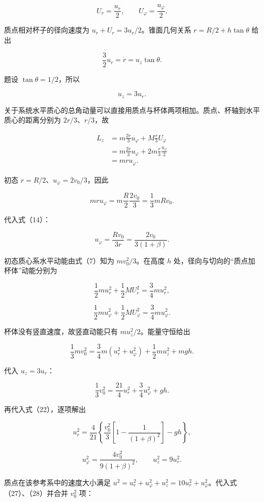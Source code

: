 \documentclass[12pt,a4paper,UTF8]{ctexart}
\begin{document}
\[
U_r=\frac{u_r}{2},
\qquad
U_\varphi=\frac{u_\varphi}{2}.
\tag{17}
\]

质点相对杯子的径向速度为 \(u_r+U_r=3u_r/2\)。锥面几何关系
\(r=R/2+h\tan\theta\) 给出

\[
\frac{3}{2}u_r
=\dot r
=u_z\tan\theta.
\tag{18}
\]

题设 \(\tan\theta=1/2\)，所以

\[
\boxed{u_z=3u_r}.
\tag{19}
\]

关于系统水平质心的总角动量可以直接用质点与杯体两项相加。质点、杯轴到水平质心的距离分别为
\(2r/3\)、\(r/3\)，故

\[
\begin{aligned}
L_z
&=m\frac{2r}{3}u_\varphi
+M\frac r3U_\varphi\\
&=m\frac{2r}{3}u_\varphi
+2m\frac r3\frac{u_\varphi}{2}\\
&=mru_\varphi.
\end{aligned}
\tag{20}
\]

初态 \(r=R/2\)、\(u_\varphi=2v_0/3\)，因此

\[
mr u_\varphi
=m\frac R2\frac{2v_0}{3}
=\frac13mRv_0.
\tag{21}
\]

代入式（14）：

\[
\boxed{
u_\varphi
=\frac{Rv_0}{3r}
=\frac{2v_0}{3(1+\beta)}
}.
\tag{22}
\]

初态质心系水平动能由式（7）知为 \(mv_0^2/3\)。在高度 \(h\)
处，径向与切向的``质点加杯体''动能分别为

\[
\frac12m u_r^2+\frac12M U_r^2
=\frac34m u_r^2,
\tag{23}
\]

\[
\frac12m u_\varphi^2+\frac12M U_\varphi^2
=\frac34m u_\varphi^2.
\tag{24}
\]

杯体没有竖直速度，故竖直动能只有 \(m u_z^2/2\)。能量守恒给出

\[
\frac13m v_0^2
=\frac34m(u_r^2+u_\varphi^2)
+\frac12m u_z^2+mgh.
\tag{25}
\]

代入 \(u_z=3u_r\)：

\[
\frac13v_0^2
=\frac{21}{4}u_r^2
+\frac34u_\varphi^2+gh.
\tag{26}
\]

再代入式（22），逐项解出

\[
\boxed{
u_r^2
=\frac4{21}\left\{
\frac{v_0^2}{3}\left[1-\frac1{(1+\beta)^2}\right]-gh
\right\}
},
\tag{27}
\]

\[
\boxed{
u_\varphi^2=\frac{4v_0^2}{9(1+\beta)^2}
},
\qquad
\boxed{u_z^2=9u_r^2}.
\tag{28}
\]

质点在该参考系中的速度大小满足
\(u^2=u_r^2+u_\varphi^2+u_z^2=10u_r^2+u_\varphi^2\)。代入式（27）、（28）并合并
\(v_0^2\) 项：
\end{document}
